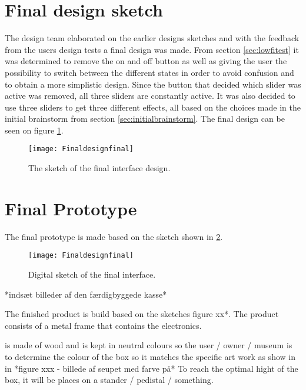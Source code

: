 \section{Final design sketch}\label{sec:finalsketch}
The design team elaborated on the earlier designs sketches and with the feedback from the users design tests a final design was made. From section \ref{sec:lowfitest} it was determined to remove the on and off button as well as giving the user the possibility to switch between the different states in order to avoid confusion and to obtain a more simplistic design. Since the button that decided which slider was active was removed, all three sliders are constantly active. It was also decided to use three sliders to get three different effects, all based on the choices made in the initial brainstorm from section \ref{sec:initialbrainstorm}. The final design can be seen on figure \ref{fig:finaldesignsketch3grey}.

\begin{figure}[!h] 
\centering
\texttt{[image: Finaldesignfinal]}
\caption{\label{fig:finaldesignsketch3grey} The sketch of the final interface design.}
\end{figure}  
 
\section{Final Prototype}\label{sec:finalprototype}

The final prototype is made based on the sketch shown in \ref{fig:Finaldesignfinal}.

\begin{figure}[!h] 
\centering
\texttt{[image: Finaldesignfinal]}
\caption{\label{fig:Finaldesignfinal} Digital sketch of the final interface.}
\end{figure}  

*indsæt billeder af den færdigbyggede kasse* 

The finished product is build based on the sketches figure xx*. The product consists of a metal frame that contains the electronics. 

is made of wood and is kept in neutral colours so the user / owner / museum is to determine the colour of the box so it matches the specific art work as show in in *figure xxx - billede af seupet med farve på* To reach the optimal hight of the box, it will be places on a stander / pedistal / something. 


